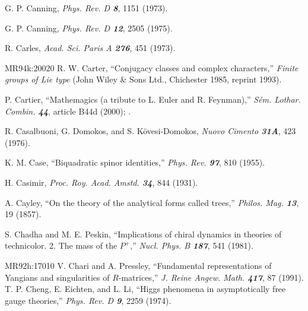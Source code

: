 G. P. Canning,
{\em Phys. Rev. D \bf 8}, 1151 (1973).

G. P. Canning,
{\em Phys. Rev.  D \bf 12}, 2505 (1975).


R. Carles,
{\em Acad. Sci. Paris  A \bf 276}, 451 (1973).

%
%
        {MR94k:20020} R. W. Carter,
     ``Conjugacy classes and complex characters,''
     {\em Finite groups of {L}ie type}
     (John Wiley \& Sons Ltd., Chichester 1985, reprint 1993).

 P. Cartier,
    ``Mathemagics (a tribute to L. Euler and R. Feynman),''
    {\em S\'em. Lothar. Combin. \bf 44}, article B44d (2000);
     .

R. Casalbuoni, G. Domokos, and S. K{\"o}vesi-Domokos,
{\em Nuovo Cimento \bf 31A}, 423 (1976).

 K. M. Case,
``Biquadratic spinor identities,''
{\em Phys.  Rev.   \bf 97}, 810 (1955).

 H. Casimir,
{\em Proc.  Roy.  Acad. Amstd.  \bf 34}, 844 (1931).

 A. Cayley,
``On the theory of the analytical forms called trees,''
{\em Philos. Mag. \bf 13}, 19 (1857). %

 S. Chadha and M. E. Peskin,
``Implications of chiral dynamics in theories of technicolor. 2. The mass of
the $P^+$,''
{\em Nucl. Phys.  B \bf 187}, 541 (1981).

        {MR92h:17010} V. Chari and A. Pressley,
``Fundamental representations of {Y}angians
  and singularities of {$R$}-matrices,''
{\em J. Reine Angew. Math. \bf 417}, 87 (1991). %
T. P. Cheng, E. Eichten, and L. Li,
``Higgs phenomena in asymptotically free gauge theories,''
{\em Phys.  Rev.    D \bf 9}, 2259 (1974).

